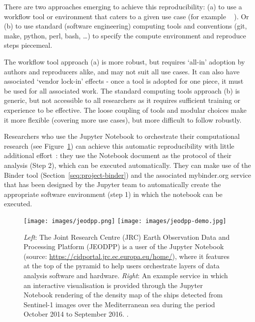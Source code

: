 There are two approaches emerging to achieve this reproducibility: (a) to use a
workflow tool or environment that caters to a given use case (for example
~\cite{reana2019} ). Or (b) to use standard
(software engineering) computing tools and conventions (git, make, python, perl,
bash, \ldots) to specify the compute environment and reproduce steps piecemeal.

The workflow tool approach (a) is more robust, but requires `all-in' adoption by authors and reproducers alike,
and may not suit all use cases. It can also have associated `vendor lock-in' effects
- once a tool is adopted for one piece, it must be used for all associated work.
The standard computing tools approach (b) is generic, but not accessible to all researchers
 as it requires sufficient training or experience to be effective.
 The loose coupling of tools and modular choices make it more flexible (covering more use cases),
 but more difficult to follow robustly.

\medskip Researchers who use the Jupyter Notebook to orchestrate their
computational research (see Figure~\ref{fig:jeodpp}) can achieve this automatic
reproducibility with little additional effort~\cite{Beg2021}: they use the Notebook document as
the protocol of their analysis (Step 2), which can be executed automatically.
They can make use of the Binder tool (Section~\ref{seq:project-binder}) and the
associated mybinder.org service that has
been designed by the Jupyter team to automatically create the appropriate
software environment (step 1) in which the notebook can be executed.

\begin{figure}[tb]
  \centering\texttt{[image: images/jeodpp.png]}
  \centering\texttt{[image: images/jeodpp-demo.jpg]}
  \caption{\emph{Left}: The Joint Research Centre (JRC) Earth Observation
    Data and Processing Platform (JEODPP) is a user of the
    Jupyter Notebook (source:
    \url{https://cidportal.jrc.ec.europa.eu/home/}), where it features
    at the top of the pyramid to help users orchestrate layers of data
    analysis software and hardware. \emph{Right}: An example
    service in which an interactive visualisation is provided through
    the Jupyter Notebook rendering of the density map of the ships
    detected from Sentinel-1 images over the Mediterranean sea during
    the period October 2014 to September 2016. \cite[Figure
    6]{Soille2018}. \label{fig:jeodpp}}
\end{figure}

